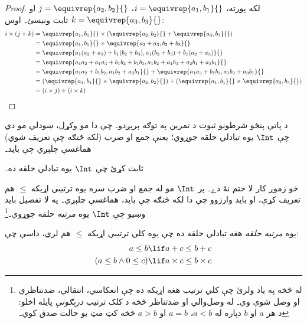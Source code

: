 \documentclass[../../../include/open-logic-section]{subfiles}
\begin{document}
\begin{proof}
لکه پورته، $i = \equivrep{a_1, b_1}{}$،
$j = \equivrep{a_2,b_2}{}$ او $k = \equivrep{a_3, b_3}{}$ ثابت
ونيسئ۔ اوس:
\begin{align*}
	i \times (j + k)
	&= \equivrep{a_1, b_1}{} \times (\equivrep{a_2,b_2}{} + \equivrep{a_3, b_3}{})\\
	&= \equivrep{a_1, b_1}{} \times \equivrep{a_2 + a_3,b_2+b_3}{}\\
	&= \equivrep{a_1  (a_2 + a_3) + b_1  (b_2+b_3), a_1  (b_2 + b_3) + b_1 (a_2 + a_3)}{}\\
	&= \equivrep{a_1 a_2 + a_1a_3 + b_1 b_2+b_1b_3, a_1 b_2 + a_1b_3 + a_2b_1 + a_3b_1}{}\\		
	&= \equivrep{a_1a_2 + b_1b_2, a_1b_2 + a_2b_1}{} + \equivrep{a_1a_3 + b_1b_3, a_1b_3 + a_3b_1}{}\\
	&= (\equivrep{a_1, b_1}{} \times \equivrep{a_2,b_2}{}) + (\equivrep{a_1, b_1}{} \times  \equivrep{a_3, b_3}{})\\
	&= (i \times j) + (i \times k)
\end{align*}
\end{proof}

د پاتې پنځو شرطونو ثبوت د تمرين په توګه پرېږدو۔ چې دا مو وکړل،
ښودلي مو دي چې $\Int$ يوه تبادلي حلقه جوړوي؛ يعنې جمع او ضرب
(لکه څنګه چې تعريف شوي) هماغسې چلېږي چې بايد۔

\begin{prob}
ثابت کړئ چې $\Int$ يوه تبادلي حلقه ده۔
\end{prob}

خو زموږ کار لا ختم نۀ دے۔ پر $\Int$ مو له جمع او ضرب سره يوه
ترتيبي اړيکه $\leq$ هم تعريف کړې، او بايد وارزوو چې دا لکه څنګه
چې بايد، هماغسې چلېږي۔ په لا تفصيل بايد وښيو چې $\Int$ يوه
\emph{مرتبه} حلقه جوړوي۔\footnote{له
	 څخه په ياد ولرئ چې کلي
	ترتيب هغه اړيکه ده چې انعکاسي، انتقالي، ضدتناظري او وصل شوې وي۔
	له وصل‌والي او ضدتناظر څخه د کلک ترتيب \emph{درېګونې}
	پايله اخلو: د هر $a$ او $b$ دپاره له $a < b$، $a=b$
	او $a>b$ څخه کټ مټ يو حالت صدق کوي۔}

\begin{defn}
يوه \emph{مرتبه حلقه} هغه تبادلي حلقه ده چې يوه کلي ترتيبي اړيکه
$\leq$ هم لري، داسې چې:
\begin{align*}
	a \leq b &\lif a + c \leq b + c\\
	(a \leq b \land 0 \leq c) &\lif a \times c \leq b \times c
\end{align*}
\end{defn}
\end{document}

